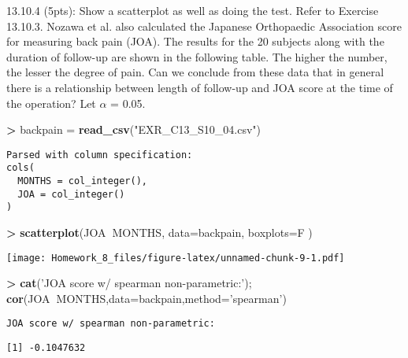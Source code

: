 \documentclass[]{article}
\newenvironment{Shaded}{\begin{snugshade}}{\end{snugshade}}
\newcommand{\KeywordTok}[1]{\textcolor[rgb]{0.13,0.29,0.53}{\textbf{#1}}}
\newcommand{\DataTypeTok}[1]{\textcolor[rgb]{0.13,0.29,0.53}{#1}}
\newcommand{\StringTok}[1]{\textcolor[rgb]{0.31,0.60,0.02}{#1}}
\newcommand{\OperatorTok}[1]{\textcolor[rgb]{0.81,0.36,0.00}{\textbf{#1}}}
\newcommand{\NormalTok}[1]{#1}
\begin{document}
13.10.4 (5pts): Show a scatterplot as well as doing the test. Refer to
Exercise 13.10.3. Nozawa et al. also calculated the Japanese Orthopaedic
Association score for measuring back pain (JOA). The results for the 20
subjects along with the duration of follow-up are shown in the following
table. The higher the number, the lesser the degree of pain. Can we
conclude from these data that in general there is a relationship between
length of follow-up and JOA score at the time of the operation? Let
\(\alpha\) = 0.05.

\begin{Shaded}
\begin{Highlighting}[]
\OperatorTok{>}\StringTok{ }\NormalTok{backpain =}\StringTok{ }\KeywordTok{read_csv}\NormalTok{(}\StringTok{"EXR_C13_S10_04.csv"}\NormalTok{)}
\end{Highlighting}
\end{Shaded}

\begin{verbatim}
Parsed with column specification:
cols(
  MONTHS = col_integer(),
  JOA = col_integer()
)
\end{verbatim}

\begin{Shaded}
\begin{Highlighting}[]
\OperatorTok{>}\StringTok{ }\KeywordTok{scatterplot}\NormalTok{(JOA}\OperatorTok{~}\NormalTok{MONTHS, }\DataTypeTok{data=}\NormalTok{backpain, }\DataTypeTok{boxplots=}\NormalTok{F )}
\end{Highlighting}
\end{Shaded}

\texttt{[image: Homework\_8\_files/figure-latex/unnamed-chunk-9-1.pdf]}

\begin{Shaded}
\begin{Highlighting}[]
\OperatorTok{>}\StringTok{ }\KeywordTok{cat}\NormalTok{(}\StringTok{'JOA score w/ spearman non-parametric:'}\NormalTok{); }\KeywordTok{cor}\NormalTok{(JOA}\OperatorTok{~}\NormalTok{MONTHS,}\DataTypeTok{data=}\NormalTok{backpain,}\DataTypeTok{method=}\StringTok{'spearman'}\NormalTok{)}
\end{Highlighting}
\end{Shaded}

\begin{verbatim}
JOA score w/ spearman non-parametric:
\end{verbatim}

\begin{verbatim}
[1] -0.1047632
\end{verbatim}
\end{document}
